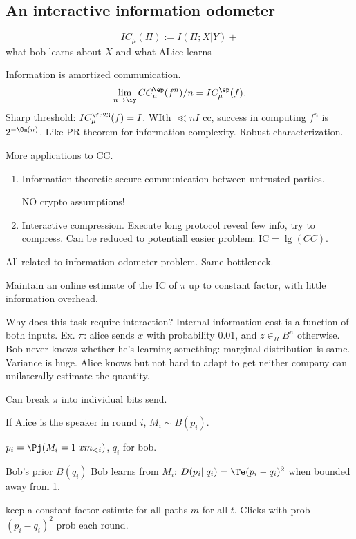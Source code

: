 \subsection{An interactive information odometer}


\[
IC_\mu(\Pi):=I(\Pi;X|Y)+
\]
what bob learns about $X$ and what ALice learns


Information is amortized communication. 
\[
\lim_{n\to \iy} CC_\mu^\ep (f^n)/n = IC_\mu^\ep(f).
\]
Sharp threshold: $IC^{\fc 23}_\mu(f)=I$. WIth $\ll nI$ cc, success in computing $f^n$ is $2^{-\Om(n)}$. Like PR theorem for information complexity. Robust characterization.


More applications to CC.
\begin{enumerate}
\item
Information-theoretic secure communication between untrusted parties. 

NO crypto assumptions!
\item
Interactive compression. Execute long protocol reveal few info, try to compress. Can be reduced to potentiall easier problem: IC$=\lg (CC)$.
\end{enumerate}

All related to information odometer problem. Same bottleneck. 

Maintain an online estimate of the IC of $\pi$ up to constant factor, with little information overhead.

Why does this task require interaction? Internal information cost is a function of both inputs. Ex. $\pi$: alice sends $x$ with probability 0.01, and $z\in_R B^n$ otherwise. Bob never knows whether he's learning something: marginal distribution is same. Variance is huge. Alice knows but not hard to adapt to get neither company can unilaterally estimate the quantity.

Can break $\pi$ into individual bits send. 

If Alice is the speaker in round $i$, $M_i\sim B(p_i)$.

$p_i=\Pj(M_i=1|xm_{<i})$, $q_i$ for bob.

Bob's prior $B(q_i)$ Bob learns from $M_i$: $D(p_i||q_i)=\Te(p_i-q_i)^2$ when bounded away from 1.

keep a constant factor estimte for all paths $m$ for all $t$.
Clicks with prob $(p_i-q_i)^2$ prob each round. 

